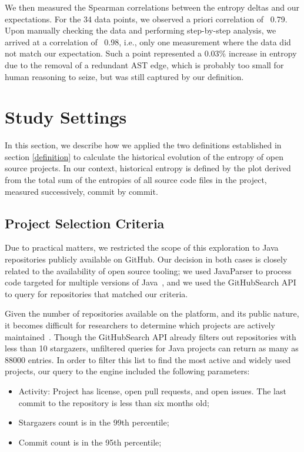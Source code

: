 \documentclass[10pt,conference]{IEEEtran}
\begin{document}
We then measured the Spearman correlations between the entropy deltas and our expectations. For the 34 data points, we observed a priori correlation of ~0.79. Upon manually checking the data and performing step-by-step analysis, we arrived at a correlation of ~0.98, i.e., only one measurement where the data did not match our expectation. Such a point represented a 0.03\% increase in entropy due to the removal of a redundant AST edge, which is probably too small for human reasoning to seize, but was still captured by our definition.

\section{Study Settings}
In this section, we describe how we applied the two definitions established in section \ref{definition} to calculate the historical evolution of the entropy of open source projects. In our context, historical entropy is defined by the plot derived from the total sum of the entropies of all source code files in the project, measured successively, commit by commit.

\subsection{Project Selection Criteria}
Due to practical matters, we restricted the scope of this exploration to Java repositories publicly available on GitHub. Our decision in both cases is closely related to the availability of open source tooling; we used JavaParser to process code targeted for multiple versions of Java~\cite{javaparser}, and we used the GitHubSearch API \cite{Dabic:msr2021githubSearch} to query for repositories that matched our criteria.

Given the number of repositories available on the platform, and its public nature, it becomes difficult for researchers to determine which projects are actively maintained~\cite{munaiah2017curating}. Though the GitHubSearch API already filters out repositories with less than 10 stargazers, unfiltered queries for Java projects can return as many as 88000 entries. In order to filter this list to find the most active and widely used projects, our query to the engine included the following parameters:

\begin{itemize}
    \item Activity: Project has license, open pull requests, and open issues. The last commit to the repository is less than six months old;
    \item Stargazers count is in the 99th percentile;
    \item Commit count is in the 95th percentile;
\end{itemize}
\end{document}
